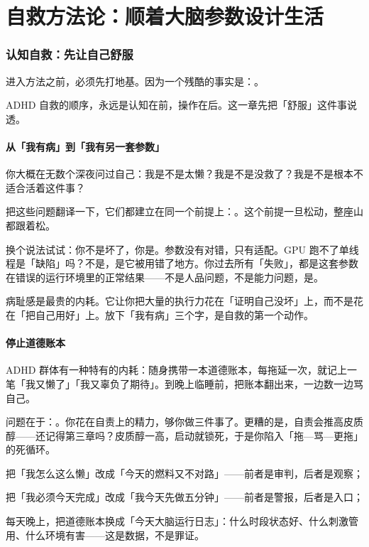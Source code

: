 \part{自救方法论：顺着大脑参数设计生活}

\section{认知自救：先让自己舒服}

进入方法之前，必须先打地基。因为一个残酷的事实是：。

ADHD 自救的顺序，永远是认知在前，操作在后。这一章先把「舒服」这件事说透。

\subsection{从「我有病」到「我有另一套参数」}

你大概在无数个深夜问过自己：我是不是太懒？我是不是没救了？我是不是根本不适合活着这件事？

把这些问题翻译一下，它们都建立在同一个前提上：。这个前提一旦松动，整座山都跟着松。

换个说法试试：你不是坏了，你是。参数没有对错，只有适配。GPU 跑不了单线程是「缺陷」吗？不是，是它被用错了地方。你过去所有「失败」，都是这套参数在错误的运行环境里的正常结果——不是人品问题，不是能力问题，是。

\begin{insight}
病耻感是最贵的内耗。它让你把大量的执行力花在「证明自己没坏」上，而不是花在「把自己用好」上。放下「我有病」三个字，是自救的第一个动作。
\end{insight}

\subsection{停止道德账本}

ADHD 群体有一种特有的内耗：随身携带一本道德账本，每拖延一次，就记上一笔「我又懒了」「我又辜负了期待」。到晚上临睡前，把账本翻出来，一边数一边骂自己。

问题在于：。你花在自责上的精力，够你做三件事了。更糟的是，自责会推高皮质醇——还记得第三章吗？皮质醇一高，启动就锁死，于是你陷入「拖—骂—更拖」的死循环。

\begin{checklist}
  \item 把「我怎么这么懒」改成「今天的燃料又不对路」——前者是审判，后者是观察；
  \item 把「我必须今天完成」改成「我今天先做五分钟」——前者是警报，后者是入口；
  \item 每天晚上，把道德账本换成「今天大脑运行日志」：什么时段状态好、什么刺激管用、什么环境有害——这是数据，不是罪证。
\end{checklist}

